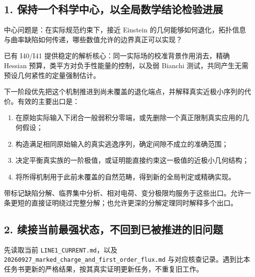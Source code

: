 \documentclass[
  10pt,
]{article}
\providecommand{\tightlist}{%
  \setlength{\itemsep}{0pt}\setlength{\parskip}{0pt}}
\begin{document}
\hypertarget{ux4fddux6301ux4e00ux4e2aux79d1ux5b66ux4e2dux5fc3ux4ee5ux5168ux5c40ux6570ux5b66ux7ed3ux8bbaux68c0ux9a8cux8fdbux5c55}{%
\subsection{1.
保持一个科学中心，以全局数学结论检验进展}\label{ux4fddux6301ux4e00ux4e2aux79d1ux5b66ux4e2dux5fc3ux4ee5ux5168ux5c40ux6570ux5b66ux7ed3ux8bbaux68c0ux9a8cux8fdbux5c55}}

中心问题是：在实际规范约束下，接近 Einstein
的几何能够如何退化，拓扑信息与曲率缺陷如何传递，哪些数值允许的边界真正可以实现？

已有 I40/I41 提供稳定的解析核心：同一实际场的校准背景作用消去，精确
Hessian 预算，类平方对负手性能量的控制，以及弱 Bianchi
测试，共同产生无需预设几何紧性的定量强制估计。

下一阶段优先把这个机制推进到尚未覆盖的退化端点，并解释真实近极小序列的代价。有效的主要出口是：

\begin{enumerate}
\def\labelenumi{\arabic{enumi}.}
\tightlist
\item
  在原始实际输入下闭合一般弱积分零端，或先删除一个真正限制真实应用的几何假设；
\item
  构造满足相同原始输入的真实逃逸序列，确定间隙不成立的准确范围；
\item
  决定平衡真实族的一阶极值，或证明能直接约束这一极值的近极小几何结构；
\item
  将所得机制用于此前未覆盖的自然范畴，得到新的全局判定或精确实现。
\end{enumerate}

带标记缺陷分解、临界集中分析、相对电荷、变分极限均服务于这些出口。允许一条更短的直接证明绕过完整分解；也允许更深的分解定理同时解释多个出口。

\hypertarget{ux7eedux63a5ux5f53ux524dux6700ux5f3aux72b6ux6001ux4e0dux56deux5230ux5df2ux88abux63a8ux8fdbux7684ux65e7ux95eeux9898}{%
\subsection{2.
续接当前最强状态，不回到已被推进的旧问题}\label{ux7eedux63a5ux5f53ux524dux6700ux5f3aux72b6ux6001ux4e0dux56deux5230ux5df2ux88abux63a8ux8fdbux7684ux65e7ux95eeux9898}}

先读取当前 \nolinkurl{LINE1_CURRENT.md}，以及
\nolinkurl{20260927_marked_charge_and_first_order_flux.md}
与对应核查记录。遇到比本任务书更新的严格结果，按其真实证明更新任务，不重复旧工作。
\end{document}
